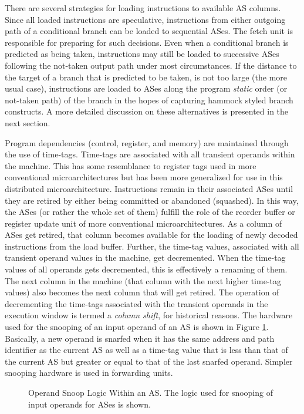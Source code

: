 \documentclass[10pt,dvips]{article}
\begin{document}
There are several strategies for
loading instructions to available AS columns.
Since all loaded instructions are speculative, instructions
from either outgoing path of a conditional branch can be loaded
to sequential ASes.
The fetch unit is responsible for preparing for such decisions.
Even when a conditional branch is predicted as being taken,
instructions may still be loaded to successive ASes following the not-taken
output path under most circumstances.  
If the distance to the target of a branch
that is predicted to be taken, is not too large (the more usual case),
instructions are loaded to ASes along the program \textit{static} order 
(or not-taken
path) of the branch in the hopes of capturing hammock styled branch
constructs.  A more detailed discussion on these alternatives is
presented in the next section.

Program dependencies (control, register, and memory) are 
maintained through the use of time-tags.
Time-tags are associated with all transient operands within the machine.
This has some resemblance to register tags used in more conventional 
microarchitectures but has been more generalized for use in this
distributed microarchitecture.  Instructions remain in their
associated ASes until they are retired by either being
committed or abandoned (squashed).  In this way, the ASes
(or rather the whole set of them)
fulfill the role of the reorder buffer or register update unit of more
conventional microarchitectures.
As a column of ASes get retired, that column becomes available
for the loading of newly decoded instructions from the load buffer.
Further, the time-tag values, associated with all transient operand
values in the machine, get decremented.
When the time-tag values of all operands gets decremented,
this is effectively a renaming of them.
The next column in the machine (that column with the next higher
time-tag values) also becomes the next column that will
get retired.
The operation of decrementing the time-tags associated with
the transient operands in the execution window is termed a \textit{column
shift}, for historical reasons.  
The hardware used for the snooping of an input operand of an AS
is shown in Figure \ref{fig:source}.
Basically, a new operand is snarfed when it has the same address and
path identifier as the current AS as well as
a time-tag value that is less than that of the current AS
but greater or equal to that of the last snarfed operand.
Simpler snooping hardware is used in forwarding units.
%
\begin{figure}
\centering
{}
\caption{Operand Snoop Logic Within an AS.
The logic used for snooping of input operands for ASes
is shown.}
\label{fig:source}
\end{figure}
%
\end{document}
